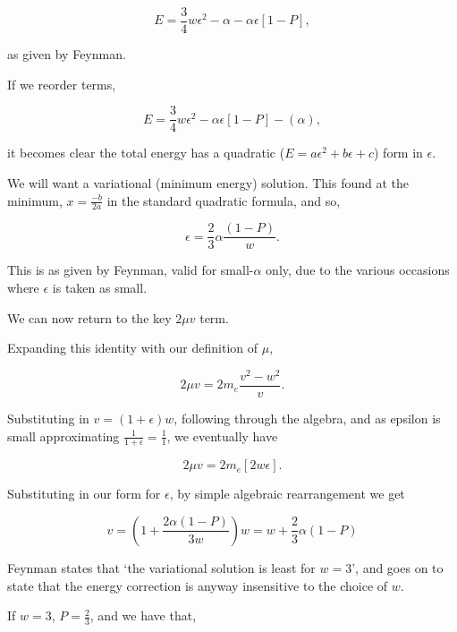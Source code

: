 \documentclass[twocolumn,11pt]{article}
\begin{document}
\begin{equation}
    E = \frac{3}{4} w\epsilon^2 -\alpha -\alpha\epsilon[1-P],
\end{equation}

as given by Feynman.

If we reorder terms,

\begin{equation}
    E = \frac{3}{4} w\epsilon^2 -\alpha\epsilon[1-P]-(\alpha),
\end{equation}

it becomes clear the total energy has a quadratic ($E =a\epsilon^2 + b\epsilon +c $) form in $\epsilon$.

We will want a variational (minimum energy) solution. This found at the
minimum, $x=\frac{-b}{2a}$ in the standard quadratic formula, and so,

\begin{equation}
    \epsilon = \frac{2}{3} \alpha \frac{(1-P)}{w}.
\end{equation}

This is as given by Feynman, valid for small-$\alpha$ only, due to the various
occasions where $\epsilon$ is taken as small.

We can now return to the key $2\mu v$ term.

Expanding this identity with our definition of $\mu$,

\begin{equation}
    2\mu v = 2m_e \frac{v^2-w^2}{v}.
\end{equation}

Substituting in $v=(1+\epsilon)w$, following through the algebra, and
as epsilon is small approximating $\frac{1}{1+\epsilon}=\frac{1}{1}$,
we eventually have

\begin{equation}
    2\mu v = 2m_e[2w\epsilon].
\end{equation}

Substituting in our form for $\epsilon$, by simple algebraic
rearrangement we get

\begin{equation}
    v=(1+\frac{2\alpha(1-P)}{3w})w = w + \frac{2}{3} \alpha (1-P)
\end{equation}

Feynman states that `the variational solution is least for $w=3$', and
goes on to state that the energy correction is anyway insensitive to the
choice of $w$.

If $w=3$, \(P=\frac{2}{3}\), and we have that,
\end{document}
